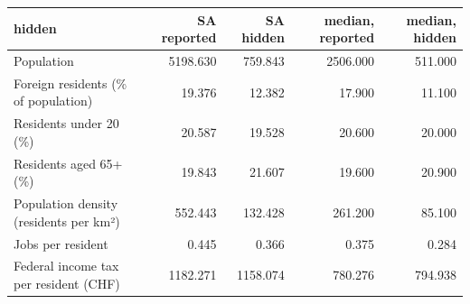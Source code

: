\begin{tabular}{lrrrr}
\toprule
hidden & SA reported & SA hidden & median, reported & median, hidden \\
\midrule
Population & 5198.630 & 759.843 & 2506.000 & 511.000 \\
Foreign residents (\% of population) & 19.376 & 12.382 & 17.900 & 11.100 \\
Residents under 20 (\%) & 20.587 & 19.528 & 20.600 & 20.000 \\
Residents aged 65+ (\%) & 19.843 & 21.607 & 19.600 & 20.900 \\
Population density (residents per km²) & 552.443 & 132.428 & 261.200 & 85.100 \\
Jobs per resident & 0.445 & 0.366 & 0.375 & 0.284 \\
Federal income tax per resident (CHF) & 1182.271 & 1158.074 & 780.276 & 794.938 \\
\bottomrule
\end{tabular}

